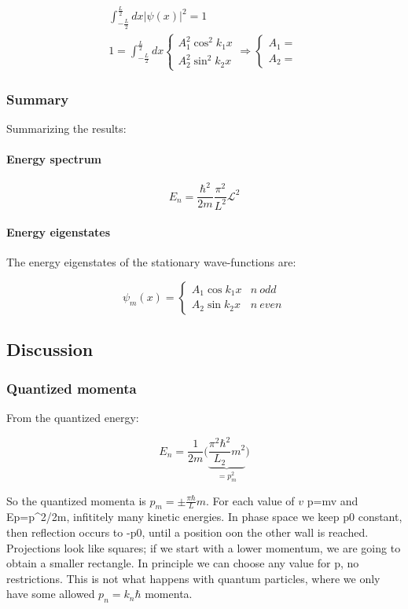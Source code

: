     \begin{align*}
      \int_{-\frac{L}{2}}^{\frac{L}{2}} dx|\psi(x)|^2 = 1\\
      1 = \int_{-\frac{L}{2}}^{\frac{L}{2}} dx\begin{cases}A_1^2\cos^2k_1x\\A_2^2\sin^2 k_2x\end{cases}\Rightarrow\begin{cases}A_1 = \\A_2 = \end{cases}
    \end{align*}

    \subsubsection{Summary}
    Summarizing the results:

      \paragraph{Energy spectrum}

      $$E_n = \frac{\hbar^2}{2m}\frac{\pi^2}{L^2}\mathcal{L}^2$$

      \paragraph{Energy eigenstates}
      The energy eigenstates of the stationary wave-functions are:

      $$\psi_m(x) = \begin{cases}A_1\cos k_1 x & n\ odd\\ A_2\sin k_2 x & n\ even\end{cases}$$
      

  \subsection{Discussion}

    \subsubsection{Quantized momenta}
    From the quantized energy:

    $$E_n = \frac{1}{2m}\biggl(\underbrace{\frac{\pi^2\hbar^2}{L_2}m^2}_{=p_m^2}\biggr)$$

    So the quantized momenta is $p_m = \pm \frac{\pi\hbar}{L}m$.
    For each value of $v$ p=mv and Ep=p^2/2m, infititely many kinetic energies. In phase space we keep p0 constant, then reflection occurs to -p0, until a position oon the other wall is reached. Projections look like squares; if we start with a lower momentum, we are going to obtain a smaller rectangle. In principle we can choose any value for p, no restrictions. This is not what happens with quantum particles, where we only have some allowed $p_n=k_n\hbar$ momenta.
    
